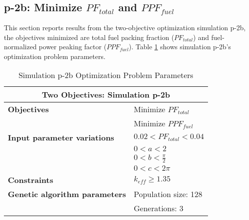 \subsection{p-2b: Minimize $PF_{total}$ and $PPF_{fuel}$}
\label{sec:p-2b}
This section reports results from the two-objective optimization simulation p-2b, the 
objectives minimized are total fuel packing fraction ($PF_{total}$) and fuel-normalized 
power peaking factor ($PPF_{fuel}$).  
Table \ref{tab:simulationp2b} shows simulation p-2b's optimization problem parameters. 
\begin{table}[H]
    \centering
    \onehalfspacing
    \caption{Simulation p-2b Optimization Problem Parameters}
	\label{tab:simulationp2b}
    \footnotesize
    \begin{tabular}{l|p{3cm}}
    \hline 
    \multicolumn{2}{c}{\textbf{Two Objectives: Simulation p-2b}} \\
    \hline 
    \textbf{Objectives} & Minimize $PF_{total}$ \\
    & Minimize $PPF_{fuel}$ \\
    \hline 
    \textbf{Input parameter variations} & $0.02<PF_{total}<0.04$ \\
    & $0<a<2$ \\
    & $0<b<\frac{\pi}{2}$ \\
    & $0<c<2\pi$ \\
    \hline
    \textbf{Constraints} & $k_{eff} \geq 1.35$\\ 
    \hline 
    \textbf{Genetic algorithm parameters} & Population size: 128 \\
    & Generations: 3 \\
    \hline
    \end{tabular}
\end{table}

